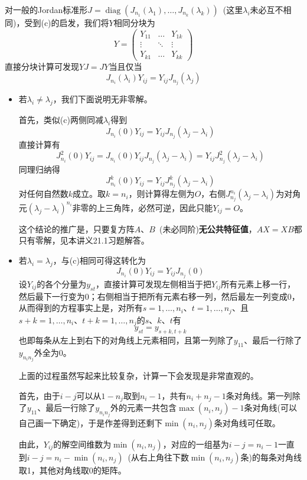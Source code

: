 \documentclass[a4paper,UTF8,fontset=windows,AutoFakeBold]{ctexart}
\DeclareMathOperator{\diag}{diag}
\newcommand*{\note}{\noindent *}
\begin{document}
\begin{enumerate}
\begin{enumerate}
        对一般的Jordan标准形$J=\diag(J_{n_1}(\lambda_1),\dots,J_{n_k}(\lambda_k))$\ (这里$\lambda_i$未必互不相同)，受到(c)的启发，我们将$Y$相同分块为
        $$Y=\begin{pmatrix}Y_{11}&\dots&Y_{1k}\\\vdots&\ddots&\vdots\\Y_{k1}&\dots&Y_{kk}\end{pmatrix}$$
        直接分块计算可发现$YJ=JY$当且仅当
        $$J_{n_i}(\lambda_i)Y_{ij}=Y_{ij}J_{n_j}(\lambda_j)$$

        \begin{itemize}
            \item 若$\lambda_i\ne\lambda_j$，我们下面说明无非零解。
            
            首先，类似(c)两侧同减$\lambda_i$得到
            $$J_{n_i}(0)Y_{ij}=Y_{ij}J_{n_j}(\lambda_j-\lambda_i)$$
            直接计算有
            $$J_{n_i}^2(0)Y_{ij}=J_{n_i}(0)Y_{ij}J_{n_j}(\lambda_j-\lambda_i)=Y_{ij}J_{n_j}^2(\lambda_j-\lambda_i)$$
            同理归纳得
            $$J_{n_i}^k(0)Y_{ij}=Y_{ij}J_{n_j}^k(\lambda_j-\lambda_i)$$
            对任何自然数$k$成立。取$k=n_i$，则计算得左侧为$O$，右侧$J_{n_j}^{n_i}(\lambda_j-\lambda_i)$为对角元$(\lambda_j-\lambda_i)^{n_i}$非零的上三角阵，必然可逆，因此只能$Y_{ij}=O$。

            \note 这个结论的推广是，只要复方阵$A$、$B$\ (未必同阶)\textbf{无公共特征值}，$AX=XB$都只有零解，见本讲义21.1习题解答。
            
            \item 若$\lambda_i=\lambda_j$，与(c)相同可得这转化为
            $$J_{n_i}(0)Y_{ij}=Y_{ij}J_{n_j}(0)$$
            设$Y_{ij}$的各个分量为$y_{st}$，直接计算可发现左侧相当于把$Y_{ij}$所有元素上移一行，然后最下一行变为0；右侧相当于把所有元素右移一列，然后最左一列变成0，从而得到的方程事实上是，对所有$s=1,\dots,n_i$、$t=1,\dots,n_j$、且$s+k=1,\dots,n_i$、$t+k=1,\dots,n_j$的$s$、$k$、$t$有
            $$y_{st}=y_{s+k,t+k}$$
            也即每条从左上到右下的对角线上元素相同，且第一列除了$y_{11}$、最后一行除了$y_{n_in_j}$外全为0。

            \note 上面的过程虽然写起来比较复杂，计算一下会发现是非常直观的。

            首先，由于$i-j$可以从$1-n_j$取到$n_i-1$，共有$n_i+n_j-1$条对角线。第一列除了$y_{11}$、最后一行除了$y_{n_in_j}$外的元素一共包含$\max(n_i,n_j)-1$条对角线(可以自己画一下确定)，于是作差得到还剩下$\min(n_i,n_j)$条对角线可任取。

            由此，$Y_{ij}$的解空间维数为$\min(n_i,n_j)$，对应的一组基为$i-j=n_i-1$一直到$i-j=n_i-\min(n_i,n_j)$\ (从右上角往下数$\min(n_i,n_j)$条)的每条对角线取1，其他对角线取0的矩阵。


\end{itemize}
\end{enumerate}
\end{enumerate}
\end{document}
